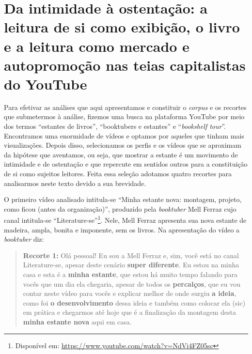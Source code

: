 \section{Da intimidade à ostentação: a leitura de si como
exibição, o livro e a leitura como mercado e autopromoção nas teias
capitalistas do YouTube}\label{sec-daintimidadeaostentação}

Para efetivar as análises que aqui apresentamos e constituir o
\textit{corpus} e os recortes que submetermos à análise, fizemos uma busca
na plataforma YouTube por meio dos termos \enquote{estantes de livros},
\enquote{booktubers e estantes} e \enquote{\textit{bookshelf tour}}. Encontramos uma enormidade de vídeos e optamos por aqueles que tinham mais
visualizações. Depois disso, selecionamos os perfis e os vídeos que se
aproximam da hipótese que aventamos, ou seja, que mostrar a estante é um
movimento de intimidade e de ostentação e que repercute em sentidos
outros para a constituição de si como sujeitos leitores. Feita essa
seleção adotamos quatro recortes para analisarmos neste texto devido a
sua brevidade.

O primeiro vídeo analisado intitula-se \enquote{Minha estante nova: montagem,
projeto, como ficou (antes da organização)}, produzido pela
\textit{booktuber} Mell Ferraz cujo canal intitula-se
\enquote{Literature-se}\footnote{Disponível em:
  \url{https://www.youtube.com/watch?v=NdVi4FZ05sc}}. Nele, Mell Ferraz
apresenta sua nova estante de madeira, ampla, bonita e imponente, sem os
livros. Na apresentação do vídeo a \textit{booktuber} diz:

\begin{quote}
\textbf{Recorte 1:}
Olá pessoal! Eu sou a Mell Ferraz e, sim, você está no canal
Literature-se, apesar deste cenário \textbf{super diferente}. Eu
estou na minha casa e esta é a \textbf{minha estante}, que estou
há muito tempo falando para vocês que um dia ela chegaria, apesar de
todos os \textbf{percalços}, que eu vou contar neste vídeo para
vocês e explicar melhor de onde surgiu \textbf{a ideia}, como
foi \textbf{o desenvolvimento} dessa ideia e também como colocar
ela (sic) em prática e chegarmos até hoje que é a finalização da
montagem desta \textbf{minha estante nova} aqui em casa.
\end{quote}


